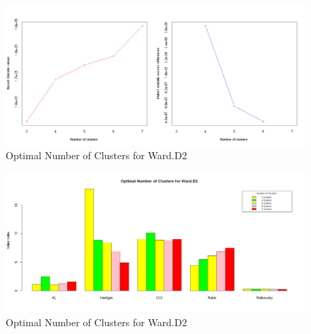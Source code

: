 \documentclass[10pt,twoside]{article}
\numberwithin{equation}{section}
\newcommand{\?}{\stackrel{?}{=}}
\begin{document}
\begin{figure}[h!]
  \centering
  \includegraphics[width=.7\textwidth]{optimal-clusters-ward-d2}
  \caption{Optimal Number of Clusters for Ward.D2}
  \label{fig:optimal-clusters}
\end{figure}

\begin{figure}[h!]
  \centering
  \includegraphics[width=.7\textwidth]{optimal-cuts}
  \caption{Optimal Number of Clusters for Ward.D2}
  \label{fig:optimal}
\end{figure}
\end{document}
